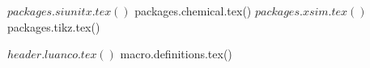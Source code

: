 
\usepackage[fakebold]{firamath-otf}
\renewcommand*\oldstylenums[1]{{\firaoldstyle #1}}


${ packages.siunitx.tex() }
${ packages.chemical.tex() }
${ packages.xsim.tex() }
${ packages.tikz.tex() }


\usepackage{icomma}
\usepackage[gen]{eurosym}
\usepackage{multicol}
\usepackage{tabularray}
\usepackage{wrapfig2}


${ header.luanco.tex() }



${ macro.definitions.tex() }